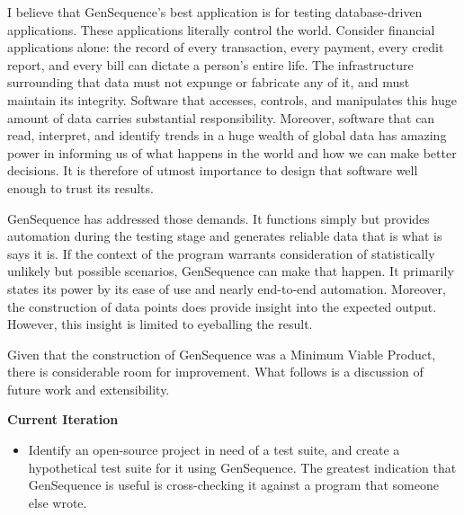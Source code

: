 
I believe that GenSequence's best application is for testing database-driven applications. These applications literally control the world. Consider financial applications alone: the record of every transaction, every payment, every credit report, and every bill can dictate a person's entire life. The infrastructure surrounding that data must not expunge or fabricate any of it, and must maintain its integrity. Software that accesses, controls, and manipulates this huge amount of data carries substantial responsibility. Moreover, software that can read, interpret, and identify trends in a huge wealth of global data has amazing power in informing us of what happens in the world and how we can make better decisions. It is therefore of utmost importance to design that software well enough to trust its results.

GenSequence has addressed those demands. It functions simply but provides automation during the testing stage and generates reliable data that is what is says it is. If the context of the program warrants consideration of statistically unlikely but possible scenarios, GenSequence can make that happen. It primarily states its power by its ease of use and nearly end-to-end automation. Moreover, the construction of data points does provide insight into the expected output. However, this insight is limited to eyeballing the result.

Given that the construction of GenSequence was a Minimum Viable Product, there is considerable room for improvement. What follows is a discussion of future work and extensibility.

\vspace{1cm}
\textbf{Current Iteration}
\begin{itemize}
\item Identify an open-source project in need of a test suite, and create a hypothetical test suite for it using GenSequence. The greatest indication that GenSequence is useful is cross-checking it against a program that someone else wrote.
\end{itemize}

